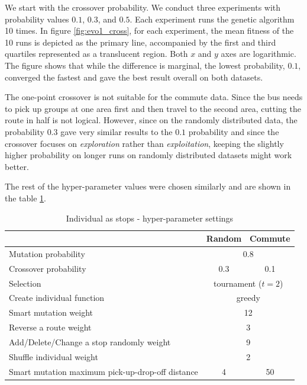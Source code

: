 \label{experiment_graph_description}
We start with the crossover probability. We conduct three experiments with probability values $0.1$, $0.3$, and $0.5$. Each experiment runs the genetic algorithm 10 times. In figure \ref{fig:evo1_cross}, for each experiment, the mean fitness of the 10 runs is depicted as the primary line, accompanied by the first and third quartiles represented as a translucent region. Both $x$ and $y$ axes are logarithmic. The figure shows that while the difference is marginal, the lowest probability, $0.1$, converged the fastest and gave the best result overall on both datasets.

The one-point crossover is not suitable for the commute data. Since the bus needs to pick up groups at one area first and then travel to the second area, cutting the route in half is not logical. However, since on the randomly distributed data, the probability $0.3$ gave very similar results to the $0.1$ probability and since the crossover focuses on \textit{exploration} rather than \textit{exploitation}, keeping the slightly higher probability on longer runs on randomly distributed datasets might work better.

The rest of the hyper-parameter values were chosen similarly and are shown in the table \ref{tab:evo_stops_hyperparams}.

\begin{table}[h]
    \centering
    \begin{tabular}{lcc}
         & Random & Commute \\
        \hline
        Mutation probability & \multicolumn{2}{c}{0.8} \\
        Crossover probability & 0.3 & 0.1 \\
        Selection & \multicolumn{2}{c}{tournament ($t=2$)} \\
        Create individual function & \multicolumn{2}{c}{greedy} \\
        Smart mutation weight & \multicolumn{2}{c}{12} \\
        Reverse a route weight & \multicolumn{2}{c}{3} \\
        Add/Delete/Change a stop randomly weight & \multicolumn{2}{c}{9} \\
        Shuffle individual weight & \multicolumn{2}{c}{2} \\
        Smart mutation maximum pick-up-drop-off distance & 4 & 50 \\
    \end{tabular}
    \caption{Individual as stops - hyper-parameter settings}
    \label{tab:evo_stops_hyperparams}
\end{table}

